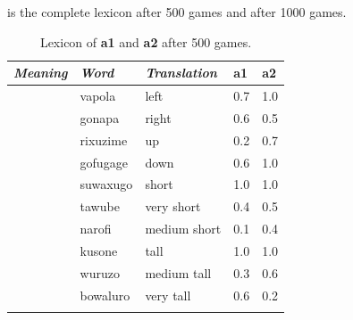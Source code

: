  is the complete lexicon after 500 games and  after 1000 games. 
\begin{table}
\begin{center}
\begin{tabular}{ l  l  l  l  l }
\lsptoprule
{\it Meaning}&{\it Word}&{\it Translation} & {\bf a1}&{\bf a2} \\ \midrule
[HPOS 0.0-0.5]&vapola&left &0.7&1.0\\ \midrule
[HPOS 0.5-1.0]&gonapa&right &0.6&0.5\\ \midrule
[VPOS 0.0-0.5]&rixuzime& up & 0.2&0.7\\ \midrule
[VPOS 0.5-1.0]&gofugage& down &0.6&1.0\\ \midrule
[HEIGHT 0.0-0.5]&suwaxugo&short & 1.0&1.0\\ \midrule
 [HEIGHT 0.0-0.25]&tawube&very short & 0.4&0.5\\ \midrule
 [HEIGHT 0.25-0.5]&narofi&medium short&0.1&0.4\\ \midrule
[HEIGHT 0.5-1.0]&kusone&tall&1.0&1.0\\ \midrule
 [HEIGHT 0.5-0.75]&wuruzo&medium tall&0.3&0.6\\ \midrule
 [HEIGHT 0.75-1.0]&bowaluro&very tall&0.6&0.2\\ \midrule
\lspbottomrule
\end{tabular}
\caption{\label{tab:lex500a} Lexicon of {\bf a1} and {\bf a2} after 500 games.}
\end{center}
\end{table}

